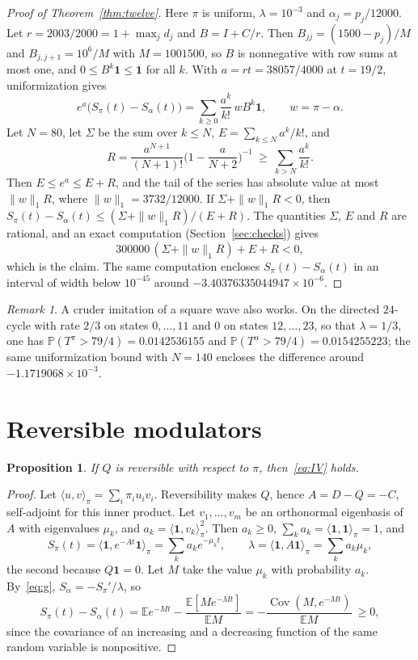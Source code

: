 \documentclass[11pt]{amsart}
\newtheorem{proposition}[theorem]{Proposition}
\theoremstyle{remark}
\newtheorem{remark}[theorem]{Remark}
\newcommand{\one}{\mathbf 1}
\newcommand{\Pp}{\mathbb P}
\newcommand{\E}{\mathbb E}
\begin{document}
\begin{proof}[Proof of Theorem~\ref{thm:twelve}]
Here $\pi$ is uniform, $\lambda=10^{-3}$ and $\alpha_j=p_j/12000$. Let $r=2003/2000=1+\max_jd_j$ and $B=I+C/r$. Then $B_{jj}=(1500-p_j)/M$ and $B_{j,j+1}=10^6/M$ with $M=1001500$, so $B$ is nonnegative with row sums at most one, and $0\le B^k\one\le\one$ for all $k$. With $a=rt=38057/4000$ at $t=19/2$, uniformization gives
\[
e^{a}\bigl(S_\pi(t)-S_\alpha(t)\bigr)=\sum_{k\ge0}\frac{a^k}{k!}\,w B^k\one,\qquad w=\pi-\alpha .
\]
Let $N=80$, let $\Sigma$ be the sum over $k\le N$, $E=\sum_{k\le N}a^k/k!$, and
\[
R=\frac{a^{N+1}}{(N+1)!}\Big(1-\frac a{N+2}\Big)^{-1}\ \ge\ \sum_{k>N}\frac{a^k}{k!}.
\]
Then $E\le e^a\le E+R$, and the tail of the series has absolute value at most $\|w\|_1R$, where $\|w\|_1=3732/12000$. If $\Sigma+\|w\|_1R<0$, then $S_\pi(t)-S_\alpha(t)\le(\Sigma+\|w\|_1R)/(E+R)$. The quantities $\Sigma$, $E$ and $R$ are rational, and an exact computation (Section~\ref{sec:checks}) gives
\[
300000\,(\Sigma+\|w\|_1R)+E+R<0,
\]
which is the claim. The same computation encloses $S_\pi(t)-S_\alpha(t)$ in an interval of width below $10^{-45}$ around $-3.40376335044947\times10^{-6}$.
\end{proof}

\begin{remark}\label{rem:24}
A cruder imitation of a square wave also works. On the directed $24$-cycle with rate $2/3$ on states $0,\dots,11$ and $0$ on states $12,\dots,23$, so that $\lambda=1/3$, one has $\Pp(T^\pi>79/4)=0.0142536155$ and $\Pp(T^\alpha>79/4)=0.0154255223$; the same uniformization bound with $N=140$ encloses the difference around $-1.1719068\times10^{-3}$.
\end{remark}

\section{Reversible modulators}

\begin{proposition}\label{prop:rev}
If $Q$ is reversible with respect to $\pi$, then~\eqref{eq:IV} holds.
\end{proposition}

\begin{proof}
Let $\langle u,v\rangle_\pi=\sum_i\pi_iu_iv_i$. Reversibility makes $Q$, hence $A=D-Q=-C$, self-adjoint for this inner product. Let $v_1,\dots,v_m$ be an orthonormal eigenbasis of $A$ with eigenvalues $\mu_k$, and $a_k=\langle\one,v_k\rangle_\pi^2$. Then $a_k\ge0$, $\sum_ka_k=\langle\one,\one\rangle_\pi=1$, and
\[
S_\pi(t)=\langle\one,e^{-At}\one\rangle_\pi=\sum_ka_ke^{-\mu_kt},\qquad \lambda=\langle\one,A\one\rangle_\pi=\sum_ka_k\mu_k,
\]
the second because $Q\one=0$. Let $M$ take the value $\mu_k$ with probability $a_k$. By~\eqref{eq:g}, $S_\alpha=-S_\pi'/\lambda$, so
\[
S_\pi(t)-S_\alpha(t)=\E e^{-Mt}-\frac{\E[Me^{-Mt}]}{\E M}=-\frac{\operatorname{Cov}(M,e^{-Mt})}{\E M}\ \ge0,
\]
since the covariance of an increasing and a decreasing function of the same random variable is nonpositive.
\end{proof}
\end{document}
